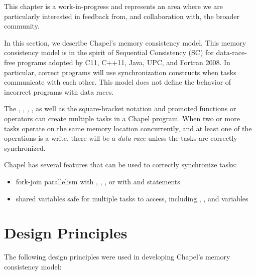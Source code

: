 \label{Memory_Consistency_Model}

\begin{openissue}
  This chapter is a work-in-progress and represents an area where we
  are particularly interested in feedback from, and collaboration
  with, the broader community.
\end{openissue}

In this section, we describe Chapel's memory consistency model. This memory
consistency model is in the spirit of Sequential Consistency (SC) for
data-race-free programs adopted by C11, C++11, Java, UPC, and Fortran 2008. In
particular, correct programs will use synchronization constructs when tasks
communicate with each other. This model does not define the behavior of
 incorrect programs with
data races.

The , , , , as well as
the 
square-bracket  notation and promoted functions or operators can
create multiple tasks in a Chapel program. When two or more tasks operate on
the same memory location concurrently, and at least one of the operations is a
write, there will be a \textit{data race} unless the tasks are correctly
synchronized.

Chapel has several 
features that can be used to correctly synchronize
tasks:

\begin{itemize}

  \item fork-join parallelism with , ,
, or with  and  statements

  \item shared variables safe for multiple tasks to access, including
, , and  variables

\end{itemize}

\section{Design Principles}

The following design principles were used in developing Chapel's memory
consistency model:

